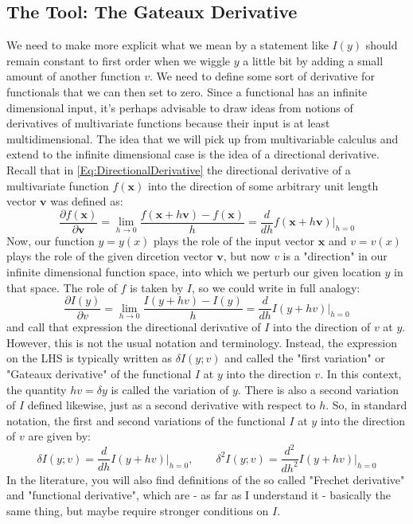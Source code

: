 \subsection{The Tool: The Gateaux Derivative}
We need to make more explicit what we mean by a statement like $I(y)$ should remain constant to first order when we wiggle $y$ a little bit by adding a small amount of another function $v$. We need to define some sort of derivative for functionals that we can then set to zero. Since a functional has an infinite dimensional input, it's perhaps advisable to draw ideas from notions of derivatives of multivariate functions because their input is at least multidimensional. The idea that we will pick up from multivariable calculus and extend to the infinite dimensional case is the idea of a directional derivative. Recall that in \ref{Eq:DirectionalDerivative} the directional derivative of a multivariate function $f(\mathbf{x})$ into the direction of some arbitrary unit length vector $\mathbf{v}$ was defined as:
\begin{equation}
 \frac{\partial f(\mathbf{x}) }{\partial \mathbf{v}} 
 = \lim_{h \rightarrow 0} \frac{f(\mathbf{x} + h \mathbf{v} ) - f(\mathbf{x})}{h}
 = \frac{d}{d h} f(\mathbf{x} + h \mathbf{v}) \bigg\rvert_{h=0}
\end{equation}
Now, our function $y = y(x)$ plays the role of the input vector $\mathbf{x}$ and $v = v(x)$ plays the role of  the given dircetion vector $\mathbf{v}$, but now $v$ is a "direction" in our infinite dimensional function space, into which we perturb our given location $y$ in that space. The role of $f$ is taken by $I$, so we could write in full analogy:
\begin{equation}
 \frac{\partial I(y) }{\partial v} 
 = \lim_{h \rightarrow 0} \frac{I(y + h v ) - I(y)}{h}
 = \frac{d}{d h} I(y + h v) \bigg\rvert_{h=0}
\end{equation}
and call that expression the directional derivative of $I$ into the direction of $v$ at $y$. However, this is not the usual notation and terminology. Instead, the expression on the LHS is typically written as $\delta I(y;v)$ and called the "first variation" or  "Gateaux derivative" of the functional $I$ at $y$ into the direction $v$. In this context, the quantity $h v = \delta y$ is called the variation of $y$. There is also a second variation of $I$ defined likewise, just as a second derivative with respect to $h$. So, in standard notation, the first and second variations of the functional $I$ at $y$ into the direction of $v$ are given by:
\begin{equation}
 \delta   I(y; v) = \frac{d}  {d h  } I(y + h v) \bigg\rvert_{h=0}, \qquad
 \delta^2 I(y; v) = \frac{d^2}{d h^2} I(y + h v) \bigg\rvert_{h=0}
\end{equation}
In the literature, you will also find definitions of the so called "Frechet derivative" and "functional derivative", which are - as far as I understand it - basically the same thing, but maybe require stronger conditions on $I$.

